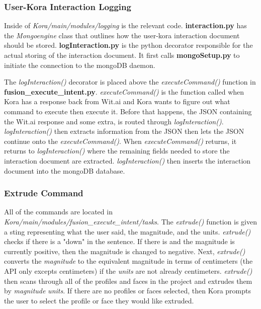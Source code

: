 \documentclass[onecolumn, draftclsnofoot,10pt, compsoc]{IEEEtran}
\begin{document}
\subsubsection{User-Kora Interaction Logging }
Inside of \textit{Kora/main/modules/logging} is the relevant code.
\textbf{interaction.py} has the \textit{Mongoengine} class that outlines how the user-kora interaction document should be stored. \textbf{logInteraction.py} is the python decorator responsible for the actual storing of the interaction document. It first calls \textbf{mongoSetup.py} to initiate the connection to the mongoDB daemon.

The \textit{logInteraction()} decorator is placed above the \textit{executeCommand()} function in \textbf{fusion\_execute\_intent.py}. \textit{executeCommand()} is the function called when Kora has a response back from Wit.ai and Kora wants to figure out what command to execute then execute it. Before that happens, the JSON containing the Wit.ai response and some extra, is routed through \textit{logInteraction()}. \textit{logInteraction()} then extracts information from the JSON then lets the JSON continue onto the \textit{executeCommand()}. When \textit{executeCommand()} returns, it returns to \textit{logInteraction()} where the remaining fields needed to store the interaction document are extracted.
\textit{logInteraction()} then inserts the interaction document into the mongoDB database.



\subsubsection{Extrude Command}
All of the commands are located in \textit{Kora/main/modules/fusion\_execute\_intent/tasks}. The \textit{extrude()} function is given a sting representing what the user said, the magnitude, and the units.
\textit{extrude()} checks if there is a "down" in the sentence. If there is and the magnitude is currently positive, then the magnitude is changed to negative. Next, \textit{extrude()} converts the \textit{magnitude} to the equivalent magnitude in terms of centimeters (the API only excepts centimeters) if the \textit{units} are not already centimeters.
\textit{extrude()} then scans through all of the profiles and faces in the project and extrudes them by \textit{magnitude} \textit{units}. If there are no profiles or faces selected, then Kora prompts the user to select the profile or face they would like extruded.
\end{document}
